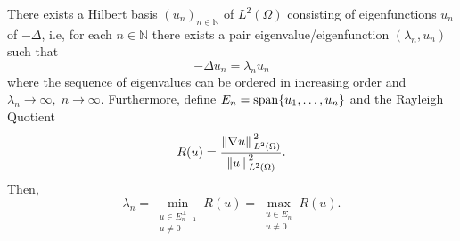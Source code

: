 \begin{theorem}\label{spec_lap_pre}
    There exists a Hilbert basis \((u_n)_{n \in \mathbb{N}}\) of \(L^2(\Omega)\) consisting of eigenfunctions \(u_n\) of \(-\Delta\), i.e, for each \(n \in \mathbb{N}\) there exists a pair eigenvalue/eigenfunction \((\lambda_n, u_n)\) such that
    \[
        -\Delta u_n = \lambda_n u_n
    \]
    where the sequence of eigenvalues can be ordered in increasing order and \(\lambda_n \rightarrow \infty, \; n \rightarrow \infty\). Furthermore, define \(E_n = \operatorname{span}\{u_1, \dots, u_n\}\) and the Rayleigh Quotient
    \[
        R(u) = \frac{\norm*{\nabla u}^2_{L^2(\Omega)}}{\norm*{u}^2_{L^2(\Omega)}}.
    \]
    Then,
    \[
    \lambda_n = \min_{\substack{u \in E^\perp_{n-1} \\ u \neq 0}} R(u) = \max_{\substack{u \in E_n \\ u \neq 0}} R(u).
    \]
\end{theorem}
